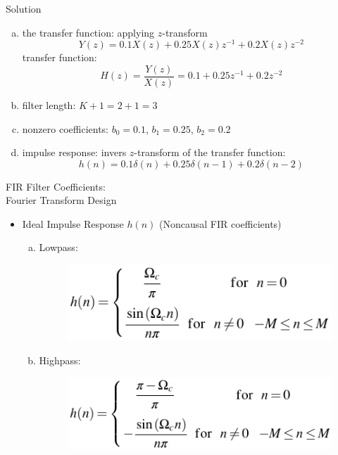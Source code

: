 \documentclass[pdflatex,compress,mathserif]{beamer}
\begin{document}
\begin{frame}{Solution}
    \begin{enumerate}[a.]
        \item the transfer function: applying $z$-transform $$ Y(z) = 0.1 X(z) + 0.25 X(z) z^{-1} + 0.2 X(z) z^{-2} $$ transfer function: $$ H(z) = \frac{Y(z)}{X(z)} = 0.1 + 0.25 z^{-1} + 0.2 z^{-2} $$
        \item filter length: $K + 1 = 2 + 1 = 3$
        \item nonzero coefficients: $b_0 = 0.1$, $b_1 = 0.25$, $b_2 = 0.2$
        \item impulse response: invers $z$-transform of the transfer function: $$h(n) = 0.1 \delta(n) + 0.25 \delta(n-1) + 0.2 \delta(n-2)$$
    \end{enumerate}
\end{frame}

\begin{frame}{FIR Filter Coefficients:\\Fourier Transform Design}
    \begin{itemize}
        \item Ideal Impulse Response $h(n)$ (Noncausal FIR coefficients)
        \begin{enumerate}[a.]
            \item Lowpass:
            \begin{figure}
                \centering
                \includegraphics[width=0.7\linewidth]{./img/img04.png}
            \end{figure}
            \item Highpass:
            \begin{figure}
                \centering
                \includegraphics[width=0.7\linewidth]{./img/img05.png}
            \end{figure}
        \end{enumerate}
    \end{itemize}    
\end{frame}
\end{document}
